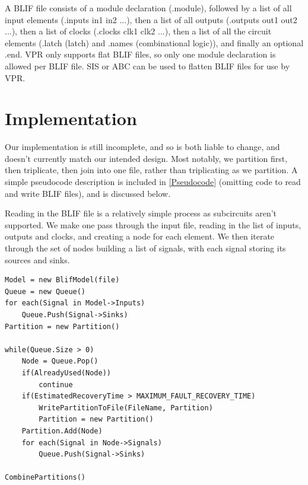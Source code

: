 \documentclass[12pt,drafta4paper,oneside]{memoir} %
\begin{document}
A \ac{BLIF} file consists of a module declaration (.module), followed by a list of all input elements (.inputs in1 in2 ...), then a list of all outputs (.outputs out1 out2 ...), then a list of clocks (.clocks clk1 clk2 ...), then a list of all the circuit elements (.latch (latch) and .names (combinational logic)), and finally an optional .end.
\ac{VPR} only supports flat \ac{BLIF} files, so only one module declaration is allowed per \ac{BLIF} file. \ac{SIS} or \ac{ABC}  can be used to flatten \ac{BLIF} files for use by \ac{VPR}.

\section{Implementation}
Our implementation is still incomplete, and so is both liable to change, and doesn't currently match our intended design. Most notably, we partition first, then triplicate, then join into one file, rather than triplicating as we partition. A simple pseudocode description is included in \ref{Pseudocode} (omitting code to read and write \ac{BLIF} files), and is discussed below.

Reading in the \ac{BLIF} file is a relatively simple process as subcircuits aren't supported. We make one pass through the input file, reading in the list of inputs, outputs and clocks, and creating a node for each element. We then iterate through the set of nodes building a list of signals, with each signal storing its sources and sinks.

\begin{lstlisting}[caption=Simplified Pseudocode,label=Pseudocode]
Model = new BlifModel(file)
Queue = new Queue()
for each(Signal in Model->Inputs)
    Queue.Push(Signal->Sinks)
Partition = new Partition()

while(Queue.Size > 0)
    Node = Queue.Pop()
    if(AlreadyUsed(Node))
        continue
    if(EstimatedRecoveryTime > MAXIMUM_FAULT_RECOVERY_TIME)
        WritePartitionToFile(FileName, Partition)
        Partition = new Partition()
    Partition.Add(Node)
    for each(Signal in Node->Signals)
        Queue.Push(Signal->Sinks)
        
CombinePartitions()
\end{lstlisting}
\end{document}
